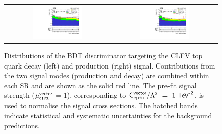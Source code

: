 \begin{figure}[tbh!]
 \begin{center}
 \begin{tabular}{cc}
  \includegraphics[width=0.48\textwidth]{figures/Part3/BDT/BDT_TT}&
  \includegraphics[width=0.48\textwidth]{figures/Part3/BDT/BDT_ST}\\
 \end{tabular}
 \caption{Distributions of the \ac{BDT} discriminator targeting the \ac{CLFV} top quark decay (left) and production (right) signal. Contributions from the two signal modes (production and decay) are combined within each \ac{SR} and are shown as the solid red line. The pre-fit signal strength ($\mu_{\textsf{e}\upmu\textsf{t{u}}}^{\textsf{vector}}$ = 1), corresponding to $\textsf{C}_{\textsf{e}\upmu\textsf{t{u}}}^{\textsf{vector}}/\mathrm{\Lambda}^2~=~1~\textsf{TeV}^{\textsf{-2}}$, is used to normalise the signal cross sections. The hatched bands indicate statistical and systematic uncertainties for the background predictions.}
 \label{fig:bdt_output}
 \end{center}
\end{figure}